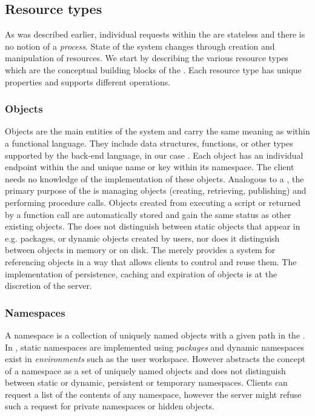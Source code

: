 \subsection{Resource types}

As was described earlier, individual requests within the \OpenCPU \API are stateless and there is no notion of a \emph{process}. State of the system changes through creation and manipulation of resources. We start by describing the various resource types which are the conceptual building blocks of the \API. Each resource type has unique properties and supports different operations.

\subsubsection{Objects}

Objects are the main entities of the system and carry the same meaning as within a functional language. They include data structures, functions, or other types supported by the back-end language, in our case \R. Each object has an individual endpoint within the \API and unique name or key within its namespace. The client needs no knowledge of the implementation of these objects. Analogous to a \UI, the primary purpose of the \API is managing objects (creating, retrieving, publishing) and performing procedure calls. Objects created from executing a script or returned by a function call are automatically stored and gain the same status as other existing objects. The \API does not distinguish between static objects that appear in e.g. packages, or dynamic objects created by users, nor does it distinguish between objects in memory or on disk. The \API merely provides a system for referencing objects in a way that allows clients to control and reuse them. The implementation of persistence, caching and expiration of objects is at the discretion of the server. 

\subsubsection{Namespaces}

A namespace is a collection of uniquely named objects with a given path in the \API. In \R, static namespaces are implemented using \emph{packages} and dynamic namespaces exist in \emph{environments} such as the user workspace. However \OpenCPU abstracts the concept of a namespace as a set of uniquely named objects and does not distinguish between static or dynamic, persistent or temporary namespaces. Clients can request a list of the contents of any namespace, however the server might refuse such a request for private namespaces or hidden objects. 

